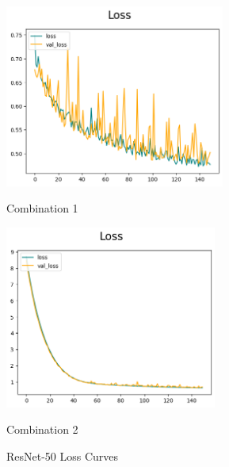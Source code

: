 \begin{figure}[H]
    \centering
    \begin{minipage}[b]{0.49\textwidth}
        \centering
        \includegraphics[width=\textwidth, height=6cm]{Figures/balanced_data/less_data/withoutbn/resnet/loss.png}
        \captionsetup{labelformat=empty}
        \caption{Combination 1}
        \label{fig:u_wo_r_l}
    \end{minipage}
    \hfill
    \begin{minipage}[b]{0.49\textwidth}
        \centering
        \includegraphics[width=\textwidth, height=6cm]{Figures/balanced_data/less_data/withbn/resnet/loss.png}
        \captionsetup{labelformat=empty}
        \caption{Combination 2}
        \label{fig:u_w_r_l}
    \end{minipage}
    \captionsetup{labelformat=default}
    \caption{ResNet-50 Loss Curves}
\end{figure}

